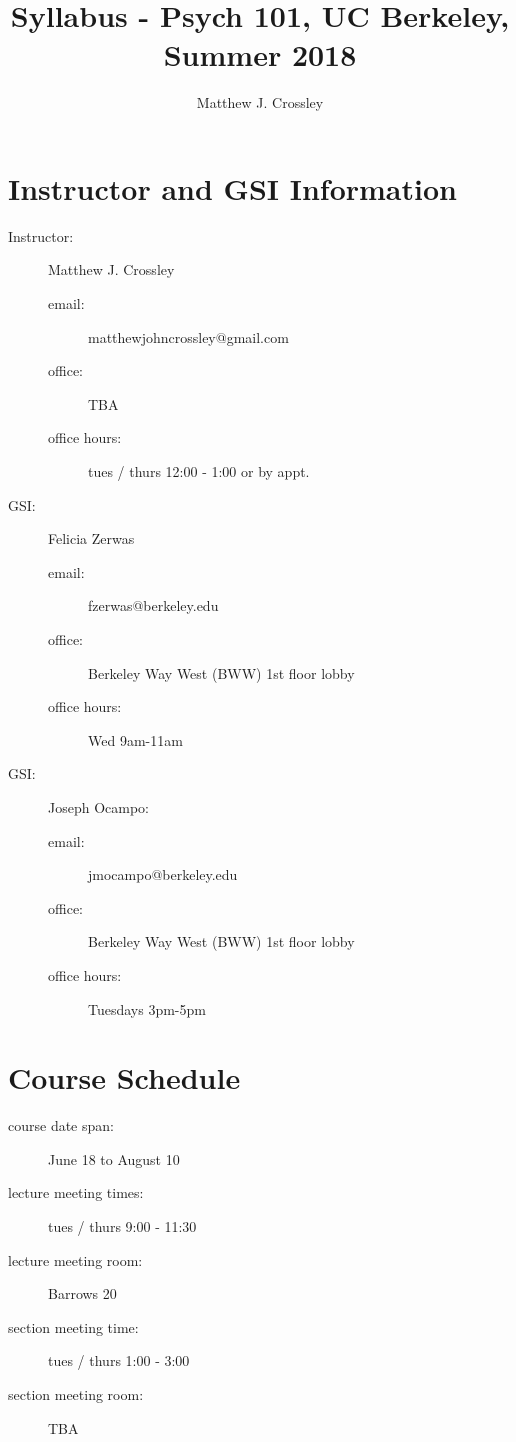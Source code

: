 \documentclass{article}
\begin{document}
\title{Syllabus - Psych 101, UC Berkeley, Summer 2018}
\author{Matthew J. Crossley}
\maketitle

\section{Instructor and GSI Information}
\begin{description}
\item [Instructor:] Matthew J. Crossley
  \begin{description}
  \item [email:] matthewjohncrossley@gmail.com
  \item [office:] TBA
  \item [office hours:] tues / thurs 12:00 - 1:00 or by appt.
  \end{description}

\item [GSI:] Felicia Zerwas
  \begin{description}
  \item [email:] fzerwas@berkeley.edu
  \item [office:] Berkeley Way West (BWW) 1st floor lobby
  \item [office hours:] Wed 9am-11am
  \end{description}

\item [GSI:] Joseph Ocampo:
    \begin{description}
  \item [email:] jmocampo@berkeley.edu
  \item [office:] Berkeley Way West (BWW) 1st floor lobby
  \item [office hours:] Tuesdays 3pm-5pm
  \end{description}
\end{description}

\section{Course Schedule}
\begin{description}
\item [course date span:] June 18 to August 10
\item [lecture meeting times:] tues / thurs 9:00 - 11:30
\item [lecture meeting room:] Barrows 20
\item [section meeting time:] tues / thurs 1:00 - 3:00
\item [section meeting room:] TBA
\end{description}
\end{document}
